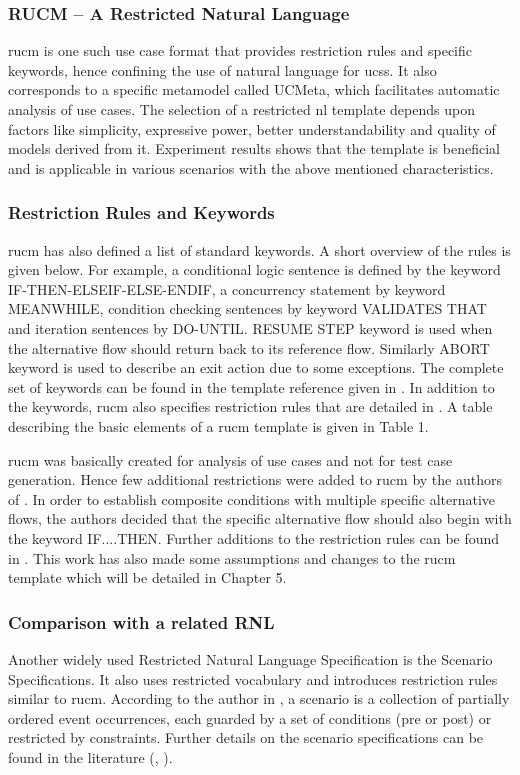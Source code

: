 \subsubsection{RUCM – A Restricted Natural Language}
\gls{rucm} \cite{yue2013facilitating} is one such use case format that provides restriction rules and specific keywords, hence confining the use of natural language for \glspl{ucs}. It also corresponds to a specific metamodel called UCMeta, which facilitates automatic analysis of use cases. The selection of a restricted \gls{nl} template depends upon factors like simplicity, expressive power, better understandability and quality of models derived from it. Experiment results \cite{yue2013facilitating} shows that the template is beneficial and is applicable in various scenarios with the above mentioned characteristics.

\subsubsection{Restriction Rules and Keywords}
\gls{rucm} has also defined a list of standard keywords. A short overview of the rules is given below. For example, a conditional logic sentence is defined by the keyword IF-THEN-ELSEIF-ELSE-ENDIF, a concurrency statement by keyword MEANWHILE, condition checking sentences by keyword VALIDATES THAT and iteration sentences by DO-UNTIL. RESUME STEP keyword is used when the alternative flow should return back to its reference flow. Similarly ABORT keyword is used to describe an exit action due to some exceptions.  The complete set of keywords can be found in the template reference given in \cite{yue2013facilitating}. In addition to the keywords, \gls{rucm} also specifies restriction rules that are detailed in \cite{yue2013facilitating}. A table describing the basic elements of a \gls{rucm} template is given in Table 1.

\gls{rucm} was basically created for analysis of use cases and not for test case generation. Hence few additional restrictions were added to \gls{rucm} by the authors of \cite{wang2015umtg}. In order to establish composite conditions with multiple specific alternative flows, the authors decided that the specific alternative flow should also begin with the keyword IF....THEN.  Further additions to the restriction rules can be found in \cite{wang2015umtg}. This work has also made some assumptions and changes to the \gls{rucm} template which will be detailed in Chapter 5.
 
\subsubsection{Comparison with a related RNL}
Another widely used Restricted Natural Language Specification is the Scenario Specifications. It also uses restricted vocabulary and introduces restriction rules similar to \gls{rucm}. According to the author in \cite{calisaya2016analysis}, a scenario is a collection of partially ordered event occurrences, each guarded by a set of conditions (pre or post) or restricted by constraints. Further details on the scenario specifications can be found in the literature (\cite{do2000scenario}, \cite{calisaya2016analysis}).

